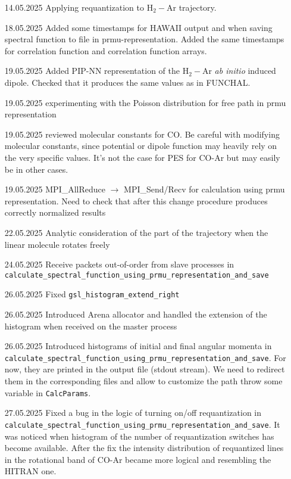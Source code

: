 \documentclass[color]{article}
\begin{document}
\begin{enumerate}
    \item [14.05.2025] Applying requantization to H$_2-$Ar trajectory.
    \item [18.05.2025] Added some timestamps for HAWAII output and when saving spectral function to file in prmu-representation. Added the same timestamps for correlation function and correlation function arrays.
    \item [19.05.2025] Added PIP-NN representation of the H$_2-$Ar \textit{ab initio} induced dipole. Checked that it produces the same values as in FUNCHAL. 
    \item [19.05.2025] experimenting with the Poisson distribution for free path in prmu representation
    \item [19.05.2025] reviewed molecular constants for CO. {\color{red} Be careful with modifying molecular constants, since potential or dipole function may heavily rely on the very specific values. It's not the case for PES for CO-Ar but may easily be in other cases.}  
    \item [19.05.2025] MPI\_AllReduce $\rightarrow$ MPI\_Send/Recv for calculation using prmu representation. {\color{red} Need to check that after this change procedure produces correctly normalized results}
    \item [22.05.2025] Analytic consideration of the part of the trajectory when the linear molecule rotates freely
    \item [24.05.2025] Receive packets out-of-order from slave processes in \texttt{calculate\_spectral\_function\_using\_prmu\_representation\_and\_save}
    \item [26.05.2025] Fixed \texttt{gsl\_histogram\_extend\_right}
    \item [26.05.2025] Introduced Arena allocator and handled the extension of the histogram when received on the master process
    \item [26.05.2025] Introduced histograms of initial and final angular momenta in \texttt{calculate\_spectral\_function\_using\_prmu\_representation\_and\_save}. For now, they are printed in the output file (stdout stream). {\color{red} We need to redirect them in the corresponding files and allow to customize the path throw some variable in \texttt{CalcParams}}.
    \item [27.05.2025] Fixed a bug in the logic of turning on/off requantization in \texttt{calculate\_spectral\_function\_using\_prmu\_representation\_and\_save}. It was noticed when histogram of the number of requantization switches has become available. After the fix the intensity distribution of requantized lines in the rotational band of CO-Ar became more logical and resembling the HITRAN one.

\end{enumerate}
\end{document}
